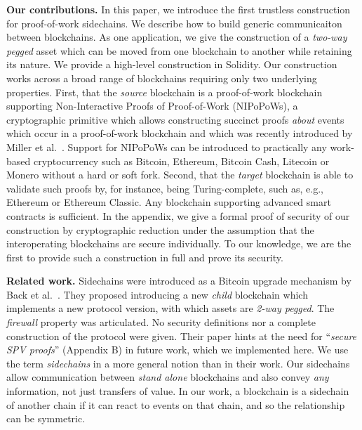 \noindent\textbf{Our contributions. } In this paper, we introduce the first
trustless construction for proof-of-work sidechains. We describe how to build
generic communicaiton between blockchains. As one application, we give the
construction of a \emph{two-way pegged} asset which can be moved from one
blockchain to another while retaining its nature. We provide a high-level
construction in Solidity. Our construction works across a broad range of
blockchains requiring only two underlying properties. First, that the
\emph{source} blockchain is a proof-of-work blockchain supporting
Non-Interactive Proofs of Proof-of-Work (NIPoPoWs), a cryptographic primitive
which allows constructing succinct proofs \emph{about} events which occur in a
proof-of-work blockchain and which was recently introduced by Miller et
al.~\cite{nipopows}. Support for NIPoPoWs can be introduced to practically any
work-based cryptocurrency such as Bitcoin, Ethereum, Bitcoin Cash, Litecoin or
Monero without a hard or soft fork. Second, that the \emph{target} blockchain is
able to validate such proofs by, for instance, being Turing-complete, such as,
e.g., Ethereum or Ethereum Classic. Any blockchain supporting advanced smart
contracts is sufficient. In the appendix, we give a formal proof of security of
our construction by cryptographic reduction under the assumption that the
interoperating blockchains are secure individually. To our knowledge, we are the
first to provide such a construction in full and prove its security.

\noindent\textbf{Related work. }
Sidechains were introduced as a Bitcoin upgrade mechanism by Back et
al.~\cite{sidechains}. They proposed introducing a new \emph{child} blockchain
which implements a new protocol version, with which assets are \emph{2-way
pegged}. The \emph{firewall} property was articulated. No security definitions
nor a complete construction of the protocol were given. Their paper hints at the
need for ``\emph{secure SPV proofs}'' (Appendix B) in future work, which we
implemented here. We use the term \emph{sidechains} in a more general notion
than in their work. Our sidechains allow communication between \emph{stand
alone} blockchains and also convey \emph{any} information, not just transfers of
value. In our work, a blockchain is a sidechain of another chain if it can react
to events on that chain, and so the relationship can be symmetric.

